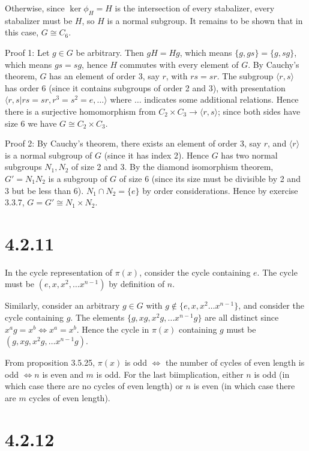 \documentclass{article}
\def\<{\langle}
\def\>{\rangle}
\begin{document}
Otherwise, since $\ker \phi_H = H$ is the intersection of every stabalizer, every stabalizer must be $H$, so $H$ is a normal subgroup. It remains to be shown that in this case, $G \cong C_6$.

Proof 1: Let $g \in G$ be arbitrary. Then $gH = Hg$, which means $\{g, gs\} = \{g, sg\}$, which means $gs = sg$, hence $H$ commutes with every element of $G$. By Cauchy's theorem, $G$ has an element of order 3, say $r$, with $rs = sr$. The subgroup $\<r, s\>$ has order 6 (since it contains subgroups of order 2 and 3), with presentation $\<r, s | rs = sr, r^3 = s^2 = e, \ldots \>$ where $\ldots$ indicates some additional relations. Hence there is a surjective homomorphism from $C_2 \times C_3 \to \<r, s\>$; since both sides have size 6 we have $G \cong C_2 \times C_3$.

Proof 2: By Cauchy's theorem, there exists an element of order 3, say $r$, and $\<r\>$ is a normal subgroup of $G$ (since it has index 2). Hence $G$ has two normal subgroups $N_1, N_2$ of size 2 and 3. By the diamond isomorphism theorem, $G' = N_1 N_2$ is a subgroup of $G$ of size 6 (since its size must be divisible by 2 and 3 but be less than 6). $N_1 \cap N_2 = \{e\}$ by order considerations. Hence by exercise 3.3.7, $G = G' \cong N_1 \times N_2$.

\section*{4.2.11}

In the cycle representation of $\pi(x)$, consider the cycle containing $e$. The cycle must be $(e, x, x^2, \ldots x^{n-1})$ by definition of $n$.

Similarly, consider an arbitrary $g \in G$ with $g \not\in \{e, x, x^2 \ldots x^{n-1}\}$, and consider the cycle containing $g$. The elements $\{g, xg, x^2g, \ldots x^{n-1}g\}$ are all distinct since $x^a g = x^b \iff x^a = x^b$. Hence the cycle in $\pi(x)$ containing $g$ must be $(g, xg, x^2g, \ldots x^{n-1} g)$.

From proposition 3.5.25, $\pi(x)$ is odd $\iff$ the number of cycles of even length is odd $\iff n$ is even and $m$ is odd. For the last biimplication, either $n$ is odd (in which case there are no cycles of even length) or $n$ is even (in which case there are $m$ cycles of even length).

\section*{4.2.12}
\end{document}
